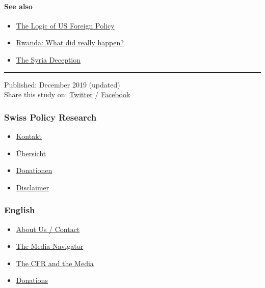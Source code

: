 \hypertarget{see-also}{%
\paragraph{See also}\label{see-also}}

\begin{itemize}
\tightlist
\item
  \href{https://swprs.org/us-foreign-policy/}{The Logic of US Foreign
  Policy}
\item
  \href{https://swprs.org/rwanda-what-did-really-happen-in-1994/}{Rwanda:
  What did really happen?}
\item
  \href{https://swprs.org/the-syria-deception/}{The Syria Deception}
\end{itemize}

\begin{center}\rule{0.5\linewidth}{\linethickness}\end{center}

Published: December 2019 (updated)\\
Share this study on:
\href{https://twitter.com/intent/tweet?url=https://swprs.org/propaganda-in-the-war-on-yugoslavia/}{Twitter}
/
\href{https://www.facebook.com/share.php?u=https://swprs.org/propaganda-in-the-war-on-yugoslavia/}{Facebook}

\hypertarget{swiss-policy-research}{%
\subsubsection{Swiss Policy Research}\label{swiss-policy-research}}

\begin{itemize}
\tightlist
\item
  \href{https://swprs.org/kontakt/}{Kontakt}
\item
  \href{https://swprs.org/uebersicht/}{Übersicht}
\item
  \href{https://swprs.org/donationen/}{Donationen}
\item
  \href{https://swprs.org/disclaimer/}{Disclaimer}
\end{itemize}

\hypertarget{english}{%
\subsubsection{English}\label{english}}

\begin{itemize}
\tightlist
\item
  \href{https://swprs.org/contact/}{About Us / Contact}
\item
  \href{https://swprs.org/media-navigator/}{The Media Navigator}
\item
  \href{https://swprs.org/the-american-empire-and-its-media/}{The CFR
  and the Media}
\item
  \href{https://swprs.org/donations/}{Donations}
\end{itemize}


